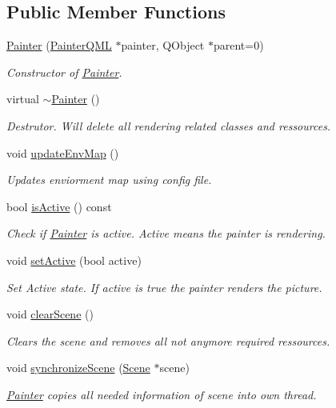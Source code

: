 \subsection*{Public Member Functions}
\begin{DoxyCompactItemize}
\item 
\hyperlink{class_painter_ae9520672fc113fc60cf942ba3d13a46e}{Painter} (\hyperlink{class_painter_q_m_l}{Painter\+Q\+M\+L} $\ast$painter, Q\+Object $\ast$parent=0)
\begin{DoxyCompactList}\small\item\em Constructor of \hyperlink{class_painter}{Painter}. \end{DoxyCompactList}\item 
virtual \hyperlink{class_painter_a6db88212368910da3385fa9e5fa97174}{$\sim$\+Painter} ()
\begin{DoxyCompactList}\small\item\em Destrutor. Will delete all rendering related classes and ressources. \end{DoxyCompactList}\item 
void \hyperlink{class_painter_a3af62665915b5f5380e7009c18862e7e}{update\+Env\+Map} ()
\begin{DoxyCompactList}\small\item\em Updates enviorment map using config file. \end{DoxyCompactList}\item 
bool \hyperlink{class_painter_addfa0fd4dd943d27c67b62dfc9ab3a0b}{is\+Active} () const 
\begin{DoxyCompactList}\small\item\em Check if \hyperlink{class_painter}{Painter} is active. Active means the painter is rendering. \end{DoxyCompactList}\item 
void \hyperlink{class_painter_a7dd43be8d3e1eab98035fcc23316bd1a}{set\+Active} (bool active)
\begin{DoxyCompactList}\small\item\em Set Active state. If active is true the painter renders the picture. \end{DoxyCompactList}\item 
void \hyperlink{class_painter_a37014617684597b602522d3de20f8f41}{clear\+Scene} ()
\begin{DoxyCompactList}\small\item\em Clears the scene and removes all not anymore required ressources. \end{DoxyCompactList}\item 
void \hyperlink{class_painter_a0c7f2b5b2bc7fa8fdfac559cc9b1401d}{synchronize\+Scene} (\hyperlink{class_scene}{Scene} $\ast$scene)
\begin{DoxyCompactList}\small\item\em \hyperlink{class_painter}{Painter} copies all needed information of scene into own thread. \end{DoxyCompactList}\end{DoxyCompactItemize}
